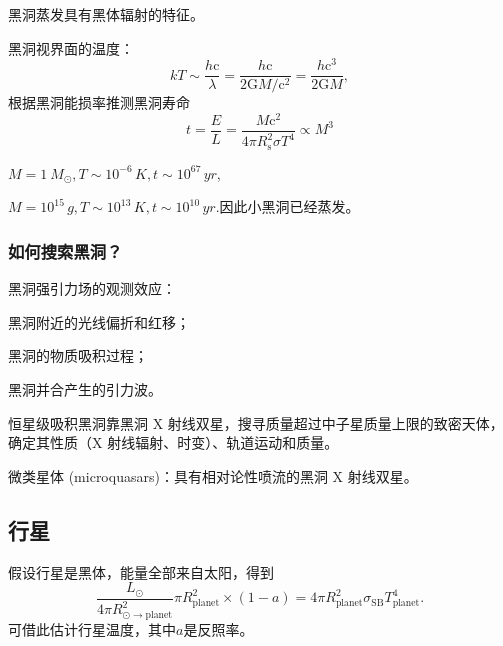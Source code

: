 \documentclass[../天体物理基础.tex]{subfiles}
\begin{document}
黑洞蒸发具有黑体辐射的特征。

黑洞视界面的温度：
\begin{equation}
kT\sim\frac{h\mathrm{c}}{\lambda}=\frac{h\mathrm{c}}{2\mathrm{G}M/\mathrm{c}^{2}}=\frac{h\mathrm{c}^{3}}{2\mathrm{G}M},
\end{equation}
根据黑洞能损率推测黑洞寿命
\begin{equation}
t=\frac{E}{L}=\frac{M\mathrm{c}^{2}}{4\pi R_{\text{s}}^{2}\sigma T^{4}}\propto{}M^{3}
\end{equation}

$M=\qty{1}{M_{\odot}},T\sim10^{-6}\,\unit{K},t\sim10^{67}\,\unit{yr}$,

$M=10^{15}\,\unit{g},T\sim10^{13}\,\unit{K},t\sim10^{10}\,\unit{yr}$.因此小黑洞已经蒸发。

\subsubsection{如何搜索黑洞？}
黑洞强引力场的观测效应：

黑洞附近的光线偏折和红移；

黑洞的物质吸积过程；

黑洞并合产生的引力波。

恒星级吸积黑洞靠黑洞 X 射线双星，搜寻质量超过中子星质量上限的致密天体，确定其性质（X 射线辐射、时变）、轨道运动和质量。

微类星体 (microquasars)：具有相对论性喷流的黑洞 X 射线双星。


\subsection{行星}
假设行星是黑体，能量全部来自太阳，得到
\begin{equation}
\frac{L_{\odot}}{4\pi R^{2}_{\odot\to\text{planet}}}\pi R_{\text{planet}}^{2}\times\left(1-a\right)=4\pi R_{\text{planet}}^{2}\sigma_{\text{SB}}T_{\text{planet}}^{4}.
\end{equation}
可借此估计行星温度，其中$a$是反照率。

\printbibliography
\end{document}
